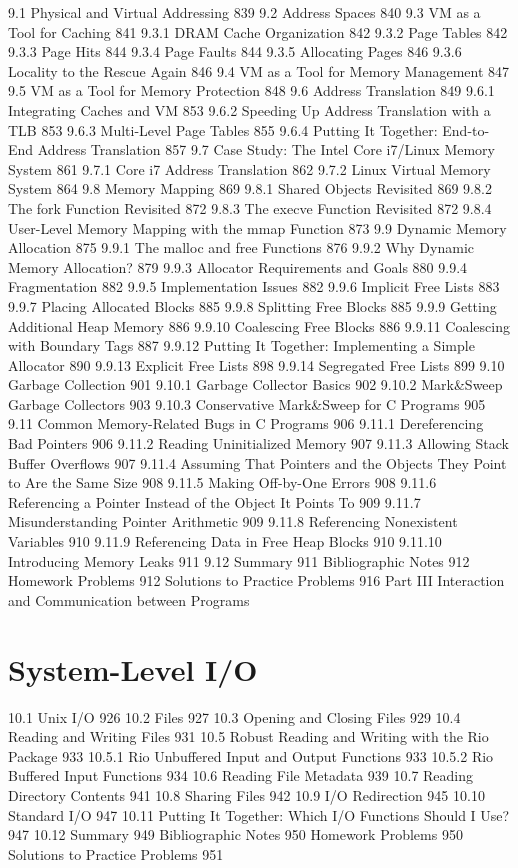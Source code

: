 9.1 Physical and Virtual Addressing 839
9.2 Address Spaces 840
9.3 VM as a Tool for Caching 841
9.3.1 DRAM Cache Organization 842
9.3.2 Page Tables 842
9.3.3 Page Hits 844
9.3.4 Page Faults 844
9.3.5 Allocating Pages 846
9.3.6 Locality to the Rescue Again 846
9.4 VM as a Tool for Memory Management 847
9.5 VM as a Tool for Memory Protection 848
9.6 Address Translation 849
9.6.1 Integrating Caches and VM 853
9.6.2 Speeding Up Address Translation with a TLB 853
9.6.3 Multi-Level Page Tables 855
9.6.4 Putting It Together: End-to-End Address Translation 857
9.7 Case Study: The Intel Core i7/Linux Memory System 861
9.7.1 Core i7 Address Translation 862
9.7.2 Linux Virtual Memory System 864
9.8 Memory Mapping 869
9.8.1 Shared Objects Revisited 869
9.8.2 The fork Function Revisited 872
9.8.3 The execve Function Revisited 872
9.8.4 User-Level Memory Mapping with the mmap Function 873
9.9 Dynamic Memory Allocation 875
9.9.1 The malloc and free Functions 876
9.9.2 Why Dynamic Memory Allocation? 879
9.9.3 Allocator Requirements and Goals 880
9.9.4 Fragmentation 882
9.9.5 Implementation Issues 882
9.9.6 Implicit Free Lists 883
9.9.7 Placing Allocated Blocks 885
9.9.8 Splitting Free Blocks 885
9.9.9 Getting Additional Heap Memory 886
9.9.10 Coalescing Free Blocks 886
9.9.11 Coalescing with Boundary Tags 887
9.9.12 Putting It Together: Implementing a Simple Allocator 890
9.9.13 Explicit Free Lists 898
9.9.14 Segregated Free Lists 899
9.10 Garbage Collection 901
9.10.1 Garbage Collector Basics 902
9.10.2 Mark&Sweep Garbage Collectors 903
9.10.3 Conservative Mark&Sweep for C Programs 905
9.11 Common Memory-Related Bugs in C Programs 906
9.11.1 Dereferencing Bad Pointers 906
9.11.2 Reading Uninitialized Memory 907
9.11.3 Allowing Stack Buffer Overflows 907
9.11.4 Assuming That Pointers and the Objects They Point to
Are the Same Size 908
9.11.5 Making Off-by-One Errors 908
9.11.6 Referencing a Pointer Instead of the Object It Points To 909
9.11.7 Misunderstanding Pointer Arithmetic 909
9.11.8 Referencing Nonexistent Variables 910
9.11.9 Referencing Data in Free Heap Blocks 910
9.11.10 Introducing Memory Leaks 911
9.12 Summary 911
Bibliographic Notes 912
Homework Problems 912
Solutions to Practice Problems 916
Part III Interaction and Communication
between Programs

\section{System-Level I/O}

10.1 Unix I/O 926
10.2 Files 927
10.3 Opening and Closing Files 929
10.4 Reading and Writing Files 931
10.5 Robust Reading and Writing with the Rio Package 933
10.5.1 Rio Unbuffered Input and Output Functions 933
10.5.2 Rio Buffered Input Functions 934
10.6 Reading File Metadata 939
10.7 Reading Directory Contents 941
10.8 Sharing Files 942
10.9 I/O Redirection 945
10.10 Standard I/O 947
10.11 Putting It Together: Which I/O Functions Should I Use? 947
10.12 Summary 949
Bibliographic Notes 950
Homework Problems 950
Solutions to Practice Problems 951


